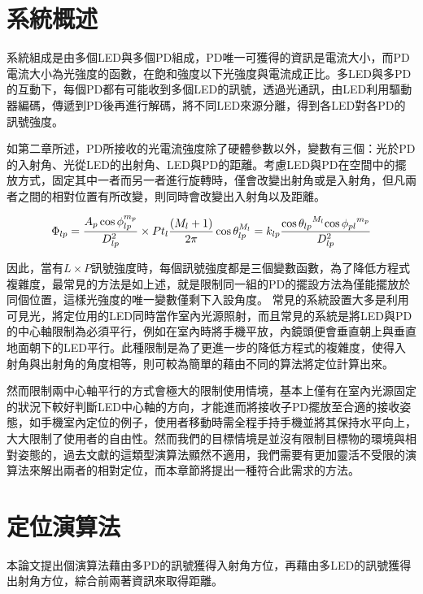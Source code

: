 \section{系統概述}


系統組成是由多個LED與多個PD組成，PD唯一可獲得的資訊是電流大小，而PD電流大小為光強度的函數，在飽和強度以下光強度與電流成正比。多LED與多PD的互動下，每個PD都有可能收到多個LED的訊號，透過光通訊，由LED利用驅動器編碼，傳遞到PD後再進行解碼，將不同LED來源分離，得到各LED對各PD的訊號強度。


如第二章所述，PD所接收的光電流強度除了硬體參數以外，變數有三個：光於PD的入射角、光從LED的出射角、LED與PD的距離。考慮LED與PD在空間中的擺放方式，固定其中一者而另一者進行旋轉時，僅會改變出射角或是入射角，但凡兩者之間的相對位置有所改變，則同時會改變出入射角以及距離。

\begin{equation}
    \Phi_{lp}=\frac{ A_p\cos\phi_{lp}^{m_{p}} }{D^2_{lp}}\times Pt_l\frac{(M_{l}+1)}{2 \pi} \cos \theta_{lp}^{M_{l}}  \\
    =k_{lp}\frac{{\cos\theta_{lp}}^{M_{l}}{\cos\phi_{pl}}^{m_{p}}}{D_{lp}^2}\\
\end{equation}

因此，當有$L\times P$訊號強度時，每個訊號強度都是三個變數函數，為了降低方程式複雜度，最常見的方法是如上述，就是限制同一組的PD的擺設方法為僅能擺放於同個位置，這樣光強度的唯一變數僅剩下入設角度。
常見的系統設置大多是利用可見光，將定位用的LED同時當作室內光源照射，而且常見的系統是將LED與PD的中心軸限制為必須平行，例如在室內時將手機平放，內鏡頭便會垂直朝上與垂直地面朝下的LED平行。此種限制是為了更進一步的降低方程式的複雜度，使得入射角與出射角的角度相等，則可較為簡單的藉由不同的算法將定位計算出來。

然而限制兩中心軸平行的方式會極大的限制使用情境，基本上僅有在室內光源固定的狀況下較好判斷LED中心軸的方向，才能進而將接收子PD擺放至合適的接收姿態，如手機室內定位的例子，使用者移動時需全程手持手機並將其保持水平向上，大大限制了使用者的自由性。然而我們的目標情境是並沒有限制目標物的環境與相對姿態的，過去文獻的這類型演算法顯然不適用，我們需要有更加靈活不受限的演算法來解出兩者的相對定位，而本章節將提出一種符合此需求的方法。

\section{定位演算法}

本論文提出個演算法藉由多PD的訊號獲得入射角方位，再藉由多LED的訊號獲得出射角方位，綜合前兩著資訊來取得距離。


